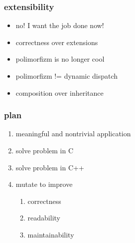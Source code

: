 \begin{frame}
    \frametitle{extensibility}
    \begin{itemize}
        \item<+-> no! I want the job done now!
        \item<+-> correctness over extensions
        \item<+-> polimorfizm is no longer cool
        \item<+-> polimorfizm != dynamic dispatch
        \item<+-> composition over inheritance
    \end{itemize}
\end{frame}

\begin{frame}
    \frametitle{plan}
    \begin{enumerate}
        \item meaningful and nontrivial application
        \item solve problem in C
        \item solve problem in C++
        \item mutate to improve
        \begin{enumerate}
            \item correctness
            \item readability
            \item maintainability
        \end{enumerate}
    \end{enumerate}
\end{frame}
